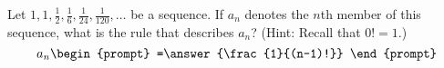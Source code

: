 \documentclass{ximera}
\author{Gregory Hartman \and Matthew Carr}
\begin{document}
\begin{exercise}



Let  $1, 1, \frac{1}{2},\frac{1}{6},\frac{1}{24}, \frac{1}{120}, \ldots$ be a sequence. If $a_n$ denotes the $n$th member of this sequence, what is the rule that describes $a_n$? (Hint: Recall that $0!=1$.)
\[
a_n
\begin{prompt}
=\answer{\frac{1}{(n-1)!}}
\end{prompt}
\]

\end{exercise}
\end{document}
